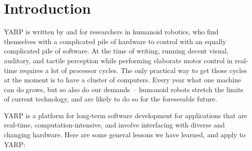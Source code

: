 \section{Introduction}

YARP is written by and for researchers in humanoid robotics, who find
themselves with a complicated pile of hardware to control with an
equally complicated pile of software.
%
At the time of writing, running decent visual, auditory, and tactile
perception while performing elaborate motor control in real-time
requires a lot of processor cycles. The only practical way to get
those cycles at the moment is to have a cluster of computers. Every
year what one machine can do grows, but so also do our demands~--
humanoid robots stretch the limits of current technology, and are
likely to do so for the foreseeable future.
%

YARP is a platform for long-term software development for applications
that are real-time, computation-intensive, and involve interfacing 
with diverse and changing hardware.
%
Here are some general lessons we have learned, and apply to YARP:

